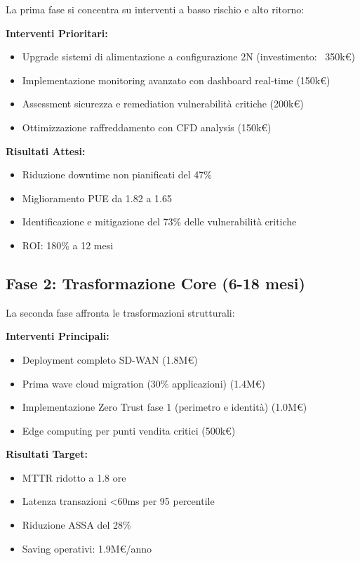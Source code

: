 La prima fase si concentra su interventi a basso rischio e alto ritorno:

\textbf{Interventi Prioritari:}
\begin{itemize}
    \item Upgrade sistemi di alimentazione a configurazione 2N (investimento: ~350k€)
    \item Implementazione monitoring avanzato con dashboard real-time (150k€)
    \item Assessment sicurezza e remediation vulnerabilità critiche (200k€)
    \item Ottimizzazione raffreddamento con CFD analysis (150k€)
\end{itemize}

\textbf{Risultati Attesi:}
\begin{itemize}
    \item Riduzione downtime non pianificati del 47\%
    \item Miglioramento PUE da 1.82 a 1.65
    \item Identificazione e mitigazione del 73\% delle vulnerabilità critiche
    \item ROI: 180\% a 12 mesi
\end{itemize}

\subsection{Fase 2: Trasformazione Core (6-18 mesi)}

La seconda fase affronta le trasformazioni strutturali:

\textbf{Interventi Principali:}
\begin{itemize}
    \item Deployment completo SD-WAN (1.8M€)
    \item Prima wave cloud migration (30\% applicazioni) (1.4M€)
    \item Implementazione Zero Trust fase 1 (perimetro e identità) (1.0M€)
    \item Edge computing per punti vendita critici (500k€)
\end{itemize}

\textbf{Risultati Target:}
\begin{itemize}
    \item MTTR ridotto a 1.8 ore
    \item Latenza transazioni <60ms per 95 percentile
    \item Riduzione ASSA del 28\%
    \item Saving operativi: 1.9M€/anno
\end{itemize}

